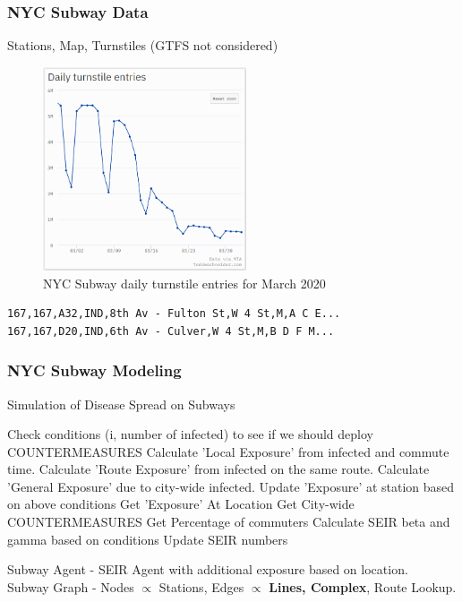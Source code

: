 \documentclass{beamer}
\begin{document}
\begin{frame}[fragile, shrink=5]
\frametitle{NYC Subway Data}
Stations, Map, Turnstiles (GTFS not considered)
\begin{figure}
    \includegraphics[width=6cm]{Scratch_Visuals/schneider_ridership.png}
    \caption{NYC Subway daily turnstile entries for March 2020 \cite{toddwschneider}}
\end{figure}
\begin{verbatim}
167,167,A32,IND,8th Av - Fulton St,W 4 St,M,A C E...
167,167,D20,IND,6th Av - Culver,W 4 St,M,B D F M...
\end{verbatim}
\end{frame}
\begin{frame}[shrink=5]
\frametitle{NYC Subway Modeling}
\begin{algorithm}[H]
\caption{Simulation of Disease Spread on Subways}\label{euclid}
\begin{algorithmic}[1]
    \State Check conditions (i, number of infected) to see if we should deploy COUNTERMEASURES
        \State Calculate 'Local Exposure' from infected and commute time.
        \State Calculate 'Route Exposure' from infected on the same route.
        \State Calculate 'General Exposure' due to city-wide infected.
        \State Update 'Exposure' at station based on above conditions
    \EndFor
        \State Get 'Exposure' At Location
        \State Get City-wide COUNTERMEASURES
        \State Get Percentage of commuters
        \State Calculate SEIR beta and gamma based on conditions
        \State Update SEIR numbers
    \EndFor
\EndFor
\end{algorithmic}
\end{algorithm}
Subway Agent - SEIR Agent with additional exposure based on location. \\
Subway Graph - Nodes $\propto$ Stations, Edges $\propto$ \textbf{Lines, Complex}, Route Lookup.
\end{frame}
\end{document}
